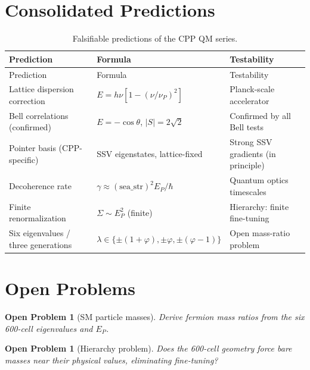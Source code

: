 \documentclass[11pt,a4paper]{article}
\newtheorem{openprob}[theorem]{Open Problem}
\newcommand{\EP}{E_P}
\begin{document}
\section{Consolidated Predictions}

\begin{longtable}{@{}p{4.2cm}p{4.0cm}p{4.0cm}@{}}
\caption{Falsifiable predictions of the CPP QM series.}\label{tab:predictions}\\
\toprule
Prediction & Formula & Testability \\
\midrule
\endfirsthead
\toprule
Prediction & Formula & Testability \\
\midrule
\endhead
\bottomrule
\endfoot
Lattice dispersion correction
& $E = h\nu[1-(\nu/\nu_P)^2]$
& Planck-scale accelerator \\[4pt]
Bell correlations (confirmed)
& $E = -\cos\theta$, $|S|=2\sqrt{2}$
& Confirmed by all Bell tests \\[4pt]
Pointer basis (CPP-specific)
& SSV eigenstates, lattice-fixed
& Strong SSV gradients (in principle) \\[4pt]
Decoherence rate
& $\gamma \approx (\text{sea\_str})^2\EP/\hbar$
& Quantum optics timescales \\[4pt]
Finite renormalization
& $\Sigma \sim E_P^2$ (finite)
& Hierarchy: finite fine-tuning \\[4pt]
Six eigenvalues / three generations
& $\lambda \in \{\pm(1+\varphi),\pm\varphi,\pm(\varphi{-}1)\}$
& Open mass-ratio problem \\
\end{longtable}

\section{Open Problems}

\begin{openprob}[SM particle masses]
Derive fermion mass ratios from the six 600-cell eigenvalues and
$\EP$.
\end{openprob}

\begin{openprob}[Hierarchy problem]
Does the 600-cell geometry force bare masses near their physical
values, eliminating fine-tuning?
\end{openprob}
\end{document}
